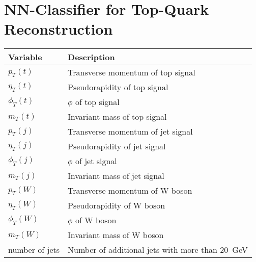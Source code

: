 \chapter{NN-Classifier for Top-Quark Reconstruction}
\label{ch:classifier}

\begin{center}
    \begin{tabular}{ll}
    \hline
    Variable & Description\\
    \hline
    $p_T(t)$ & Transverse momentum of top signal\\
    $\eta_T(t)$ & Pseudorapidity of top signal\\
    $\phi_T(t)$ & $\phi$ of top signal\\
    $m_T(t)$ & Invariant mass of top signal\\

    $p_T(j)$ & Transverse momentum of jet signal\\
    $\eta_T(j)$ & Pseudorapidity of jet signal\\
    $\phi_T(j)$ & $\phi$ of jet signal\\
    $m_T(j)$ & Invariant mass of jet signal\\

    $p_T(W)$ & Transverse momentum of W boson\\
    $\eta_T(W)$ & Pseudorapidity of W boson\\
    $\phi_T(W)$ & $\phi$ of W boson\\
    $m_T(W)$ & Invariant mass of W boson\\

    number of jets & Number of additional jets with more than \SI{20}{GeV}\\
  \end{tabular}
\end{center}
